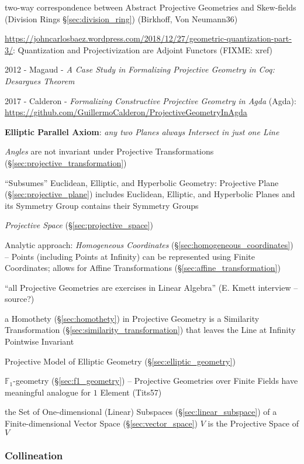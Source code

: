 two-way correspondence between Abstract Projective Geometries and Skew-fields
(Division Rings \S\ref{sec:division_ring}) (Birkhoff, Von Neumann36)

\url{https://johncarlosbaez.wordpress.com/2018/12/27/geometric-quantization-part-3/}:
Quantization and Projectivization are Adjoint Functors (FIXME: xref)

2012 - Magaud - \emph{A Case Study in Formalizing Projective Geometry in Coq:
Desargues Theorem}

2017 - Calderon - \emph{Formalizing Constructive Projective Geometry in Agda}
(Agda): \url{https://github.com/GuillermoCalderon/ProjectiveGeometryInAgda}

\textbf{Elliptic Parallel Axiom}: \emph{any two Planes always Intersect in just
  one Line}

\emph{Angles} are not invariant under Projective Transformations
(\S\ref{sec:projective_transformation})

``Subsumes'' Euclidean, Elliptic, and Hyperbolic Geometry: Projective
Plane (\S\ref{sec:projective_plane}) includes Euclidean, Elliptic, and
Hyperbolic Planes and its Symmetry Group contains their Symmetry
Groups

\emph{Projective Space} (\S\ref{sec:projective_space})

Analytic approach: \emph{Homogeneous Coordinates}
(\S\ref{sec:homogeneous_coordinates}) -- Points (including Points at Infinity)
can be represented using Finite Coordinates; allows for Affine Transformations
(\S\ref{sec:affine_transformation}) %

``all Projective Geometries are exercises in Linear Algebra'' (E.
Kmett interview -- source?) %

a Homothety (\S\ref{sec:homothety}) in Projective Geometry is a Similarity
Transformation (\S\ref{sec:similarity_transformation}) that leaves the Line at
Infinity Pointwise Invariant

Projective Model of Elliptic Geometry (\S\ref{sec:elliptic_geometry})

\fist $\mathbb{F}_1$-geometry (\S\ref{sec:f1_geometry}) -- Projective Geometries
over Finite Fields have meaningful analogue for $1$ Element (Tits57)

\fist the Set of One-dimensional (Linear) Subspaces
(\S\ref{sec:linear_subspace}) of a Finite-dimensional Vector Space
(\S\ref{sec:vector_space}) $V$ is the Projective Space of $V$



\subsubsection{Collineation}\label{sec:collineation}

